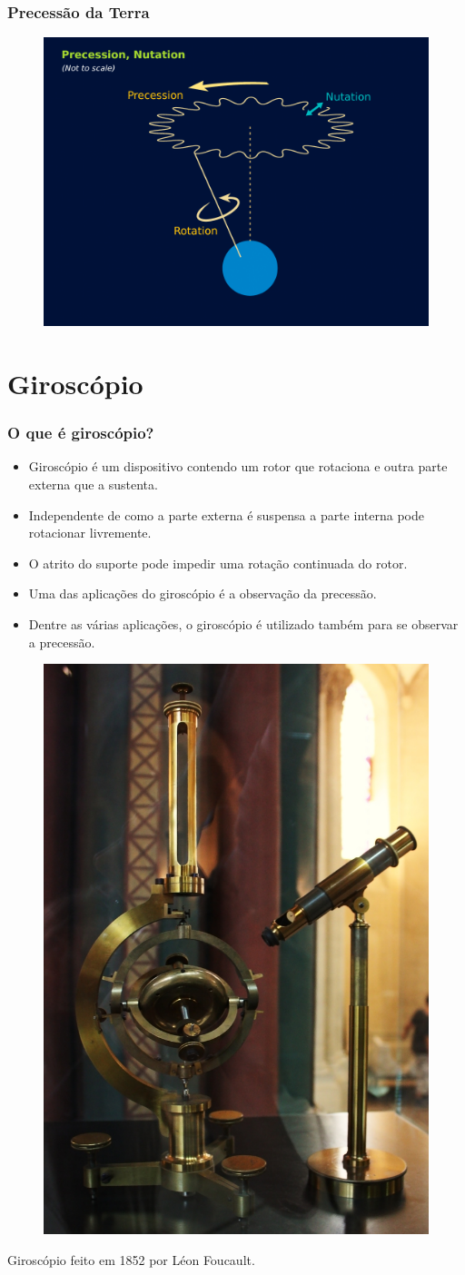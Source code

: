 \documentclass{beamer}
\begin{document}
\begin{frame}
\frametitle{Precessão da Terra}
\begin{figure}
\includegraphics[width=3.7 in]{figuras/Precession_Nutation.png}
\end{figure}
\end{frame}


\section{Giroscópio}


\begin{frame}
\frametitle{O que é giroscópio?}
\begin{itemize}
\item Giroscópio é um dispositivo contendo um rotor que rotaciona e outra parte externa que a sustenta. 
\item Independente de como a parte externa é suspensa a parte interna pode rotacionar livremente.
\item O atrito do suporte pode impedir uma rotação continuada do rotor.
\item Uma das aplicações do giroscópio é a observação da precessão.
\item Dentre as várias aplicações, o giroscópio é utilizado também para se observar a precessão.
\end{itemize}
\end{frame}


\begin{frame}
\begin{figure}
\includegraphics[width=2.0 in]{figuras/giroscopio_foucault.jpg}
\end{figure}
Giroscópio feito em 1852 por Léon Foucault.
\end{frame}
\end{document}
